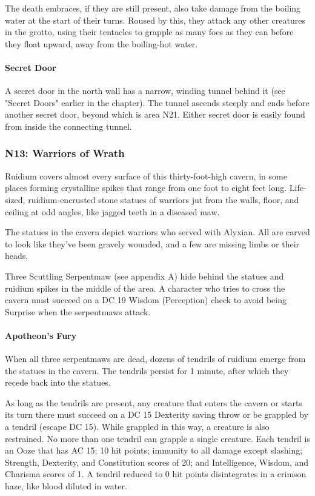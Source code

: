 \documentclass[10pt,a4paper,twoside,bg=print,twocolumn,openany,nodeprecatedcode]{dndbook}
\begin{document}
The death embraces, if they are still present, also take damage from the boiling water at the start of their turns. Roused by this, they attack any other creatures in the grotto, using their tentacles to grapple as many foes as they can before they float upward, away from the boiling-hot water.

\paragraph{Secret Door}
A secret door in the north wall has a narrow, winding tunnel behind it (see "Secret Doors" earlier in the chapter). The tunnel ascends steeply and ends before another secret door, beyond which is area N21. Either secret door is easily found from inside the connecting tunnel.



\subsubsection{N13: Warriors of Wrath}

\begin{DndReadAloud}{}
Ruidium covers almost every surface of this thirty-foot-high cavern, in some places forming crystalline spikes that range from one foot to eight feet long. Life-sized, ruidium-encrusted stone statues of warriors jut from the walls, floor, and ceiling at odd angles, like jagged teeth in a diseased maw.

\end{DndReadAloud}

The statues in the cavern depict warriors who served with Alyxian. All are carved to look like they've been gravely wounded, and a few are missing limbs or their heads.

Three Scuttling Serpentmaw (see appendix A) hide behind the statues and ruidium spikes in the middle of the area. A character who tries to cross the cavern must succeed on a DC 19 Wisdom (Perception) check to avoid being Surprise when the serpentmaws attack.

\paragraph{Apotheon's Fury}
When all three serpentmaws are dead, dozens of tendrils of ruidium emerge from the statues in the cavern. The tendrils persist for 1 minute, after which they recede back into the statues.

As long as the tendrils are present, any creature that enters the cavern or starts its turn there must succeed on a DC 15 Dexterity saving throw or be grappled by a tendril (escape DC 15). While grappled in this way, a creature is also restrained. No more than one tendril can grapple a single creature. Each tendril is an Ooze that has AC 15; 10 hit points; immunity to all damage except slashing; Strength, Dexterity, and Constitution scores of 20; and Intelligence, Wisdom, and Charisma scores of 1. A tendril reduced to 0 hit points disintegrates in a crimson haze, like blood diluted in water.
\end{document}
